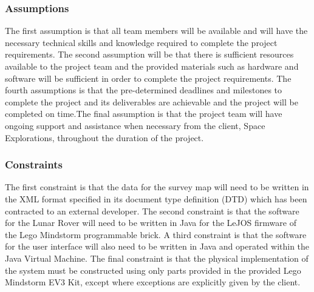\documentclass{article}
\begin{document}
\subsubsection{Assumptions}
\begin{adjustwidth}{2em}{0pt}
The first assumption is that all team members will be available and will have the necessary technical skills and knowledge required to complete the project requirements. The second assumption will be that there is sufficient resources available to the project team and the provided materials such as hardware and software will be sufficient in order to complete the project requirements. The fourth assumptions is that the pre-determined deadlines and milestones to complete the project and its deliverables are achievable and the project will be completed on time.The final assumption is that the project team will have ongoing support and assistance when necessary from the client, Space Explorations, throughout the duration of the project.\\
\end{adjustwidth}

\subsubsection{Constraints}
\begin{adjustwidth}{2em}{0pt}
The first constraint is that the data for the survey map will need to be written in the XML format specified in its document type definition (DTD) which has been contracted to an external developer. The second constraint is that the software for the Lunar Rover will need to be written in Java for the LeJOS firmware of the Lego Mindstorm programmable brick. A third constraint is that the software for the user interface will also need to be written in Java and operated within the Java Virtual Machine. The final constraint is that the physical implementation of the system must be constructed using only parts provided in the provided Lego Mindstorm EV3 Kit, except where exceptions are explicitly given by the client. \\
\end{adjustwidth}

\end{document}
